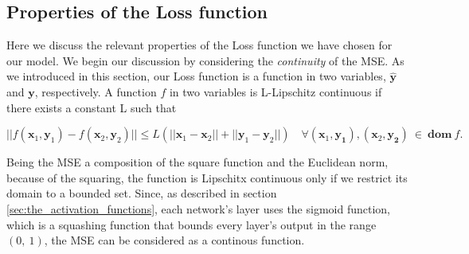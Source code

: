         \subsection{Properties of the Loss function} %
        \label{sub:properties_of_the_loss_function}
            Here we discuss the relevant properties of the Loss function we have chosen for our model. We begin our
            discussion by considering the \textit{continuity} of the MSE. As we introduced in this section, our
            Loss function is a function in two variables, $\hat{\mathbf{y}}$ and $\mathbf{y}$, respectively. A
            function $f$ in two variables is L-Lipschitz continuous if there exists a constant L such that

            \begin{equation*}
                || f(\mathbf{x}_1, \mathbf{y}_1) - f(\mathbf{x}_2, \mathbf{y}_2) || \le L(|| \mathbf{x}_1 -
                \mathbf{x}_2|| + || \mathbf{y}_1 - \mathbf{y}_2||) \quad \forall (\mathbf{x}_1, \mathbf{y_1}),
                (\mathbf{x}_2, \mathbf{y_2}) \ \in \ \mathbf{dom} \ f.
            \end{equation*}

            Being the MSE a composition of the square function and the Euclidean norm, because of the squaring, the
            function is Lipschitx continuous only if we restrict its domain to a bounded set. Since, as described
            in section \ref{sec:the_activation_functions}, each network's layer uses the sigmoid function, which is
            a squashing function that bounds every layer's output in the range $\left ( 0,\ 1 \right )$, the MSE
            can be considered as a continous function.


